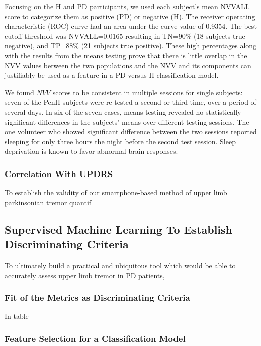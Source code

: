Focusing on the H and PD participants, we used each subject’s mean NVVALL score to categorize them as positive (PD) or negative (H). The receiver operating characteristic (ROC) curve had an area-under-the-curve value of 0.9354. The best cutoff threshold was NVVALL=0.0165 resulting in TN=90\% (18 subjects true negative), and TP=88\% (21 subjects true positive). These high percentages along with the results from the means testing prove that there is little overlap in the NVV values between the two populations and the NVV and its components can justifiably be used as a feature in a PD versus H classification model. 

We found $NVV$ scores to be consistent in multiple sessions for single subjects: seven of the \gls{PenH} subjects were re-tested a second or third time, over a period of several days. In six of the seven cases, means testing revealed no statistically significant differences in the subjects’ means over different testing sessions. The one volunteer who showed significant difference between the two sessions reported sleeping for only three hours the night before the second test session. Sleep deprivation is known to favor abnormal brain responses.





\subsubsection{Correlation With UPDRS}
\label{subsubsec:PenCTCorrelation}
To establish the validity of our smartphone-based method of upper limb parkinsonian tremor quantif

\subsection{Supervised Machine Learning To Establish Discriminating Criteria}
\label{subsec:PenCTML}
To ultimately build a practical and ubiquitous tool which would be able to accurately assess upper limb tremor in \gls{PD} patients, 


\subsubsection{Fit of the Metrics as Discriminating Criteria}
\label{subsubsec:PenCTMetricsFit}
In table 


\subsubsection{Feature Selection for a Classification Model}
\label{subsubsec:PenCTFeatures}



